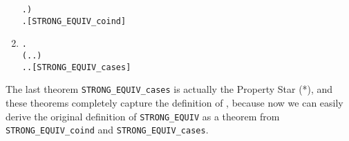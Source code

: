 \begin{enumerate}
\begin{alltt}
                \HOLSymConst{\HOLTokenExists{}}.  \HOLTokenTransBegin{}\HOLTokenTransEnd {} \HOLSymConst{\HOLTokenConj{}}   ) \HOLSymConst{\HOLTokenImp{}}
   \HOLSymConst{\HOLTokenForall{}} .    \HOLSymConst{\HOLTokenImp{}}  \HOLSymConst{\HOLTokenStrongEQ} \hfill{[STRONG_EQUIV_coind]}
\end{alltt}
\item \begin{alltt}
\HOLTokenTurnstile{}  \HOLSymConst{\HOLTokenStrongEQ}  \HOLSymConst{\HOLTokenEquiv{}}
   \HOLSymConst{\HOLTokenForall{}}.
       (\HOLSymConst{\HOLTokenForall{}}.  \HOLTokenTransBegin{}\HOLTokenTransEnd {} \HOLSymConst{\HOLTokenImp{}} \HOLSymConst{\HOLTokenExists{}}.  \HOLTokenTransBegin{}\HOLTokenTransEnd {} \HOLSymConst{\HOLTokenConj{}}  \HOLSymConst{\HOLTokenStrongEQ} ) \HOLSymConst{\HOLTokenConj{}}
       \HOLSymConst{\HOLTokenForall{}}.  \HOLTokenTransBegin{}\HOLTokenTransEnd {} \HOLSymConst{\HOLTokenImp{}} \HOLSymConst{\HOLTokenExists{}}.  \HOLTokenTransBegin{}\HOLTokenTransEnd {} \HOLSymConst{\HOLTokenConj{}}  \HOLSymConst{\HOLTokenStrongEQ} \hfill{[STRONG_EQUIV_cases]}
\end{alltt}
\end{enumerate}
The last theorem \texttt{STRONG_EQUIV_cases} is actually the Property
Star (*), and these theorems completely capture the definition of
, because now we can easily derive the original definition of
\texttt{STRONG_EQUIV} as a theorem from \texttt{STRONG_EQUIV_coind}
and \texttt{STRONG_EQUIV_cases}.


